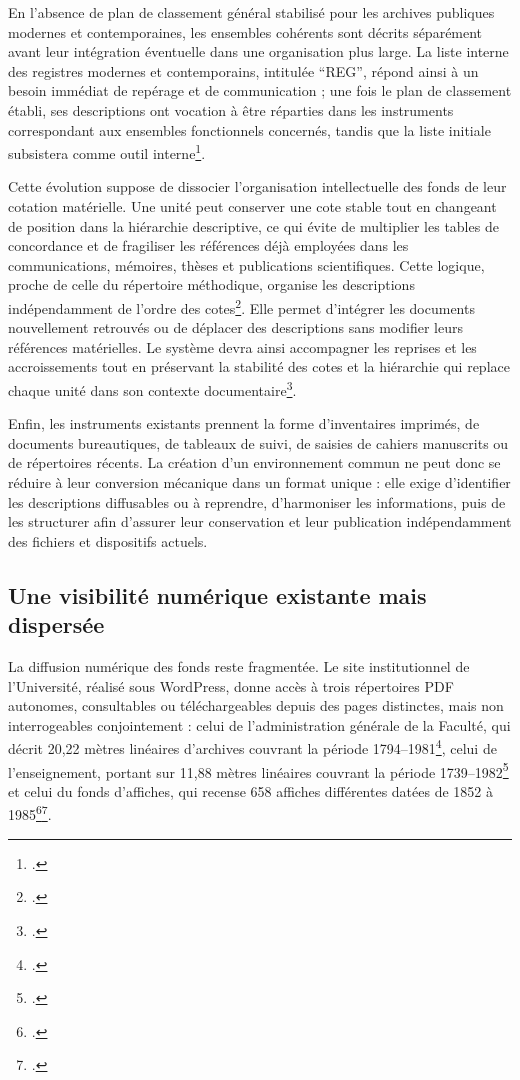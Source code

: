En l'absence de plan de classement général stabilisé pour les archives publiques modernes et contemporaines, les ensembles cohérents sont décrits séparément avant leur intégration éventuelle dans une organisation plus large. La liste interne des registres modernes et contemporains, intitulée \enquote{REG}, répond ainsi à un besoin immédiat de repérage et de communication ; une fois le plan de classement établi, ses descriptions ont vocation à être réparties dans les instruments correspondant aux ensembles fonctionnels concernés, tandis que la liste initiale subsistera comme outil interne\footcite{Dikoff2024Registres}.

Cette évolution suppose de dissocier l'organisation intellectuelle des fonds de leur cotation matérielle. Une unité peut conserver une cote stable tout en changeant de position dans la hiérarchie descriptive, ce qui évite de multiplier les tables de concordance et de fragiliser les références déjà employées dans les communications, mémoires, thèses et publications scientifiques. Cette logique, proche de celle du répertoire méthodique, organise les descriptions indépendamment de l'ordre des cotes\footcite{PIAFRepertoireMethodique}. Elle permet d'intégrer les documents nouvellement retrouvés ou de déplacer des descriptions sans modifier leurs références matérielles. Le système devra ainsi accompagner les reprises et les accroissements tout en préservant la stabilité des cotes et la hiérarchie qui replace chaque unité dans son contexte documentaire\footcite{ISADG2000}.

Enfin, les instruments existants prennent la forme d'inventaires imprimés, de documents bureautiques, de tableaux de suivi, de saisies de cahiers manuscrits ou de répertoires récents. La création d'un environnement commun ne peut donc se réduire à leur conversion mécanique dans un format unique : elle exige d'identifier les descriptions diffusables ou à reprendre, d'harmoniser les informations, puis de les structurer afin d'assurer leur conservation et leur publication indépendamment des fichiers et dispositifs actuels.

\subsection{Une visibilité numérique existante mais dispersée}

La diffusion numérique des fonds reste fragmentée. Le site institutionnel de l'Université, réalisé sous WordPress, donne accès à trois répertoires PDF autonomes, consultables ou téléchargeables depuis des pages distinctes, mais non interrogeables conjointement : celui de l'administration générale de la Faculté, qui décrit 20,22 mètres linéaires d'archives couvrant la période 1794--1981\footcite{Perroud2009FondsModerne}, celui de l'enseignement, portant sur 11,88 mètres linéaires couvrant la période 1739--1982\footcite{Pin2013Enseignement} et celui du fonds d'affiches, qui recense 658 affiches différentes datées de 1852 à 1985\footcite{PerroudBertrandDikoff2025Affiches}\footcite{UMPatrimoineArchives}.

